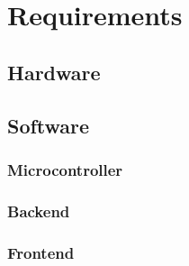 \chapter{Requirements}
    \section{Hardware}
    \section{Software}
        \subsection{Microcontroller}
        \subsection{Backend}
        \subsection{Frontend}
